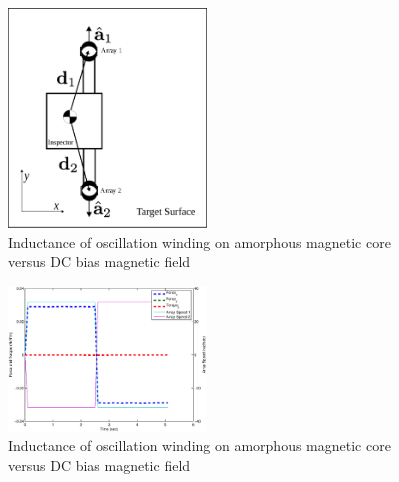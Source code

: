 \documentclass[letterpaper, 10 pt, conference]{ieeeconf}  %
\begin{document}
 
   \begin{figure}[thpb]
      \centering

      \includegraphics[width = 0.47\textwidth]{figures/surface_locomotion.eps}
      \caption{Inductance of oscillation winding on amorphous
       magnetic core versus DC bias magnetic field}
      \label{figurelabel}
   \end{figure}
   
   
     \begin{figure}[thpb]
      \centering

      \includegraphics[width = 0.47\textwidth]{figures/planar_translation.eps}
      \caption{Inductance of oscillation winding on amorphous
       magnetic core versus DC bias magnetic field}
      \label{figurelabel}
   \end{figure}
   
\end{document}
